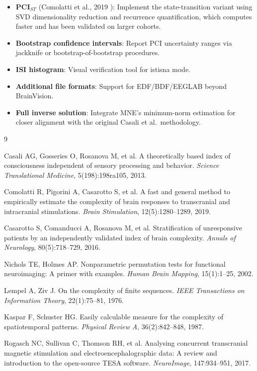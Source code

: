 \documentclass[11pt,a4paper]{article}
\begin{document}
\begin{itemize}[leftmargin=2em]
  \item \textbf{PCI$_{ST}$} (Comolatti et al., 2019 \cite{comolatti2019}): Implement the
        state-transition variant using SVD dimensionality reduction and recurrence
        quantification, which computes faster and has been validated on larger cohorts.
  \item \textbf{Bootstrap confidence intervals}: Report PCI uncertainty ranges via
        jackknife or bootstrap-of-bootstrap procedures.
  \item \textbf{ISI histogram}: Visual verification tool for istisna mode.
  \item \textbf{Additional file formats}: Support for EDF/BDF/EEGLAB beyond BrainVision.
  \item \textbf{Full inverse solution}: Integrate MNE's minimum-norm estimation for closer
        alignment with the original Casali et al.\ methodology.
\end{itemize}

\begin{thebibliography}{9}

Casali AG, Gosseries O, Rosanova M, et al.
A theoretically based index of consciousness independent of sensory processing and behavior.
\emph{Science Translational Medicine}, 5(198):198ra105, 2013.

Comolatti R, Pigorini A, Casarotto S, et al.
A fast and general method to empirically estimate the complexity of brain responses to
transcranial and intracranial stimulations.
\emph{Brain Stimulation}, 12(5):1280--1289, 2019.

Casarotto S, Comanducci A, Rosanova M, et al.
Stratification of unresponsive patients by an independently validated index of brain complexity.
\emph{Annals of Neurology}, 80(5):718--729, 2016.

Nichols TE, Holmes AP.
Nonparametric permutation tests for functional neuroimaging: A primer with examples.
\emph{Human Brain Mapping}, 15(1):1--25, 2002.

Lempel A, Ziv J.
On the complexity of finite sequences.
\emph{IEEE Transactions on Information Theory}, 22(1):75--81, 1976.

Kaspar F, Schuster HG.
Easily calculable measure for the complexity of spatiotemporal patterns.
\emph{Physical Review A}, 36(2):842--848, 1987.

Rogasch NC, Sullivan C, Thomson RH, et al.
Analysing concurrent transcranial magnetic stimulation and electroencephalographic data:
A review and introduction to the open-source TESA software.
\emph{NeuroImage}, 147:934--951, 2017.

\end{thebibliography}
\end{document}
